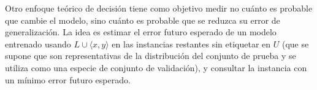 
Otro enfoque teórico de decisión tiene como objetivo medir no cuánto es probable que cambie el modelo, sino cuánto es probable que se reduzca su error de generalización. La
idea es estimar el error futuro esperado de un modelo entrenado usando $ L \cup \langle x, y \rangle $ en
las instancias restantes sin etiquetar en $ U $ (que se supone que son representativas de la distribución del conjunto de prueba y se utiliza como una especie de conjunto de validación), y consultar la instancia
con un mínimo error futuro esperado. 

%
%
%
%


